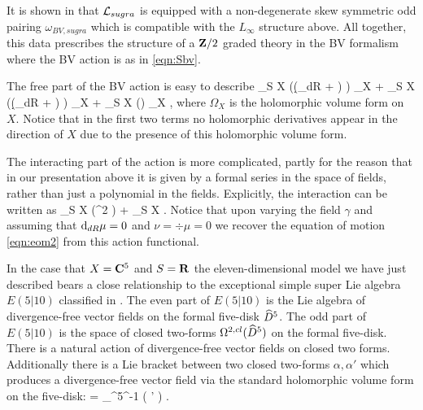 It is shown in \cite{RSW} that $\cL_{sugra}$ is equipped with a non-degenerate skew symmetric odd pairing $\omega_{BV,sugra}$ which is compatible with the $L_\infty$ structure above.
All together, this data prescribes the structure of a $\Z/2$ graded theory in the BV formalism where the BV action is as in \eqref{eqn:Sbv}.

The free part of the BV action is easy to describe
\beqn
\label{eqn:free}
\int_{S \times X} \left(\gamma (\d_{dR} + \dbar) \mu\right) \Omega_X + \int_{S \times X} (\beta (\d_{dR} + \dbar) \nu) \Omega_X + \int_{S \times X} (\beta \div \mu) \Omega_X ,
\eeqn
where $\Omega_X$ is the holomorphic volume form on~$X$.
Notice that in the first two terms no holomorphic derivatives appear in the direction of $X$ due to the presence of this holomorphic volume form.

The interacting part of the action is more complicated, partly for the reason that in our presentation above it is given by a formal series in the space of fields, rather than just a polynomial in the fields. 
Explicitly, the interaction can be written as
\beqn
\label{eqn:int}
 \int_{S \times X} (\mu^2 \del \gamma)  +  \int_{S \times X} \gamma \del \gamma \del \gamma .
\eeqn
Notice that upon varying the field $\gamma$ and assuming that $\d_{dR} \mu = 0$ and $\nu = \div \mu = 0$ we recover the equation of motion \eqref{eqn:eom2} from this action functional. 
%

\parsec[s:e510]

In the case that $X = \C^5$ and $S = \R$ the eleven-dimensional model we have just described bears a close relationship to the exceptional simple super Lie algebra $E(5|10)$ classified in \cite{KacClass}.
The even part of $E(5|10)$ is the Lie algebra of divergence-free vector fields on the formal five-disk $\Hat{D}^5$. 
The odd part of $E(5|10)$ is the space of closed two-forms $\Omega^{2,cl}(\Hat{D}^5)$ on the formal five-disk.
There is a natural action of divergence-free vector fields on closed two forms. 
Additionally there is a Lie bracket between two closed two-forms $\alpha,\alpha'$ which produces a divergence-free vector field via the standard holomorphic volume form on the five-disk:
 = \Omega_{^5}^{-1} \vee ( \alpha \wedge \alpha' ) .
\eeqn

